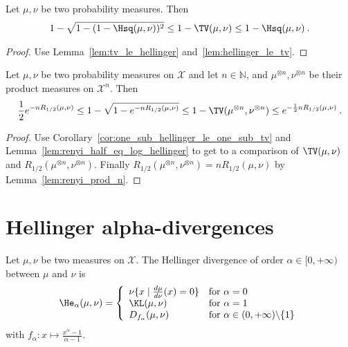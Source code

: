 \begin{corollary}
  \label{cor:one_sub_hellinger_le_one_sub_tv}
  Let $\mu, \nu$ be two probability measures. Then
  \begin{align*}
  1 - \sqrt{1 - (1 - \Hsq(\mu, \nu))^2} \le 1 - \TV(\mu, \nu) \le 1 - \Hsq(\mu, \nu)
  \: .
  \end{align*}
\end{corollary}

\begin{proof}
Use Lemma~\ref{lem:tv_le_hellinger} and~\ref{lem:hellinger_le_tv}.
\end{proof}

\begin{corollary}
  \label{cor:one_sub_tv_bound_renyi}
  Let $\mu, \nu$ be two probability measures on $\mathcal X$ and let $n \in \mathbb{N}$, and $\mu^{\otimes n}, \nu^{\otimes n}$ be their product measures on $\mathcal X^n$. Then
  \begin{align*}
  \frac{1}{2}e^{-n R_{1/2}(\mu, \nu)} \le 1 - \sqrt{1 - e^{-n R_{1/2}(\mu, \nu)}} \le 1 - \TV(\mu^{\otimes n}, \nu^{\otimes n}) \le e^{-\frac{1}{2} n R_{1/2}(\mu, \nu)}
  \: .
  \end{align*}
\end{corollary}

\begin{proof}
Use Corollary~\ref{cor:one_sub_hellinger_le_one_sub_tv} and Lemma~\ref{lem:renyi_half_eq_log_hellinger} to get to a comparison of $\TV(\mu, \nu)$ and $R_{1/2}(\mu^{\otimes n}, \nu^{\otimes n})$. Finally $R_{1/2}(\mu^{\otimes n}, \nu^{\otimes n}) = n R_{1/2}(\mu, \nu)$ by Lemma~\ref{lem:renyi_prod_n}.
\end{proof}


\section{Hellinger alpha-divergences}

\begin{definition}
  \label{def:hellingerAlpha}
  \leanok
  Let $\mu, \nu$ be two measures on $\mathcal X$. The Hellinger divergence of order $\alpha \in [0,+\infty)$ between $\mu$ and $\nu$ is
  \begin{align*}
  \He_\alpha(\mu, \nu) = \left\{
  \begin{array}{ll}
    \nu \{x \mid \frac{d\mu}{d\nu} (x) = 0\} & \text{for } \alpha = 0 \\
    \KL(\mu, \nu) & \text{for } \alpha = 1
    \\
    D_{f_\alpha}(\mu, \nu) & \text{for } \alpha \in (0,+\infty) \backslash \{1\}
  \end{array}\right.
  \end{align*}
  with $f_\alpha : x \mapsto \frac{x^{\alpha} - 1}{\alpha - 1}$.
\end{definition}


